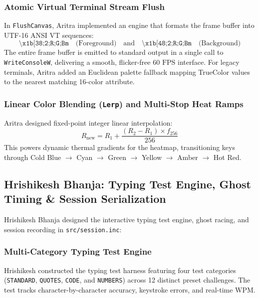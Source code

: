 \documentclass[11pt,a4paper]{article}
\begin{document}
\subsubsection{Atomic Virtual Terminal Stream Flush}
In \texttt{FlushCanvas}, Aritra implemented an engine that formats the frame buffer into UTF-16 ANSI VT sequences:
\begin{equation}
  \texttt{\textbackslash x1b[38;2;R;G;Bm}\quad \text{(Foreground)}\quad\text{and}\quad\texttt{\textbackslash x1b[48;2;R;G;Bm}\quad \text{(Background)}
\end{equation}
The entire frame buffer is emitted to standard output in a single call to \texttt{WriteConsoleW}, delivering a smooth, flicker-free $60\text{ FPS}$ interface. For legacy terminals, Aritra added an Euclidean palette fallback mapping TrueColor values to the nearest matching 16-color attribute.

\subsubsection{Linear Color Blending (\texttt{Lerp}) and Multi-Stop Heat Ramps}
Aritra designed fixed-point integer linear interpolation:
\begin{equation}
  R_{\text{new}} = R_1 + \frac{(R_2 - R_1) \times f_{256}}{256}
\end{equation}
This powers dynamic thermal gradients for the heatmap, transitioning keys through Cold Blue $\rightarrow$ Cyan $\rightarrow$ Green $\rightarrow$ Yellow $\rightarrow$ Amber $\rightarrow$ Hot Red.

\subsection{Hrishikesh Bhanja: Typing Test Engine, Ghost Timing \& Session Serialization}
Hrishikesh Bhanja designed the interactive typing test engine, ghost racing, and session recording in \texttt{src/session.inc}:

\subsubsection{Multi-Category Typing Test Engine}
Hrishikesh constructed the typing test harness featuring four test categories (\texttt{STANDARD}, \texttt{QUOTES}, \texttt{CODE}, and \texttt{NUMBERS}) across 12 distinct preset challenges. The test tracks character-by-character accuracy, keystroke errors, and real-time WPM.
\end{document}
